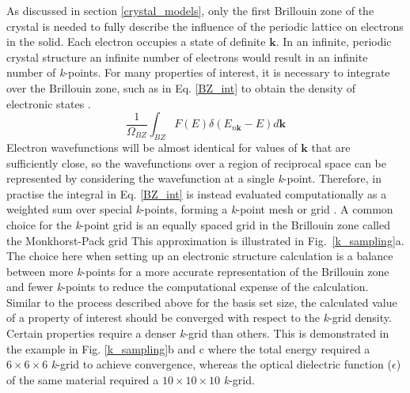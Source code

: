 \documentclass[11pt, twoside]{report}
\begin{document}
As discussed in section \ref{crystal_models}, only the first Brillouin zone of the crystal is needed to fully describe the influence of the periodic lattice on electrons in the solid.
Each electron occupies a state of definite $\mathbf{k}$. In an infinite, periodic crystal structure an infinite number of electrons would result in an infinite number of \textit{k}-points. For many properties of interest, it is necessary to integrate over the Brillouin zone, such as in Eq. \ref{BZ_int} to obtain the density of electronic states \cite{vasp_k-sampling_slides}.
\begin{equation}\label{BZ_int}
\frac{1}{\Omega_{BZ}} \int_{BZ} F(E)\delta(E_{n\mathbf{k}}-E)d\mathbf{k}    
\end{equation}
Electron wavefunctions will be almost identical for values of $\mathbf{k}$ that are sufficiently close, so the wavefunctions over a region of reciprocal space can be represented by considering the wavefunction at a single \textit{k}-point. Therefore, in practise the integral in Eq. \ref{BZ_int} is instead evaluated computationally as a weighted sum over special \textit{k}-points, forming a \textit{k}-point mesh or grid \cite{vasp_k-sampling_slides}. A common choice for the \textit{k}-point grid is an equally spaced grid in the Brillouin zone called the Monkhorst-Pack grid \cite{MonkhorstPack}
This approximation is illustrated in Fig.~\ref{k_sampling}a. The choice here when setting up an electronic structure calculation is a balance between more \textit{k}-points for a more accurate representation of the Brillouin zone and fewer \textit{k}-points to reduce the computational expense of the calculation. Similar to the process described above for the basis set size, the calculated value of a property of interest should be converged with respect to the \textit{k}-grid density. Certain properties require a denser \textit{k}-grid than others. This is demonstrated in the example in Fig. \ref{k_sampling}b and c where the total energy required a $6\times6\times6$ \textit{k}-grid to achieve convergence, whereas the optical dielectric function ($\epsilon$) of the same material required a $10\times10\times10$ \textit{k}-grid.
\end{document}
